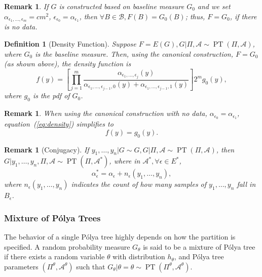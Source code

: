 \documentclass[12pt]{article}
\newtheorem{deff}[thm]{Definition}
\newtheorem{rmk}[thm]{Remark}
\newcommand{\polya}{P\'{o}lya}
\DeclareMathOperator{\pt}{PT}
\begin{document}
\begin{rmk}
  If $G$ is constructed based on baseline measure $G_0$ and we set
  $\alpha_{\epsilon_1, \ldots, \epsilon_m} = cm^2 $,
  $\epsilon_{\epsilon_0 }= \alpha_{\epsilon_1}$, then $\forall B \in
  \mathcal{B}, F(B) = G_0(B)$; thus, $F=G_0$, if there is no data.
\end{rmk}

\begin{deff}[Density Function]
  Suppose $F=E(G), G|\Pi, \mathcal{A} \sim \pt (\Pi, \mathcal{A})$,
  where $G_0 $ is the baseline measure. Then, using the canonical
  construction, $F=G_0$ (as shown above), the density function is
  \begin{equation}\label{eq:density}
    f(y) = \left[ \prod_{j=1}^m \frac{ \alpha_{\epsilon_1, \ldots,
          \epsilon_j}(y)}{\alpha_{\epsilon_1, \ldots, \epsilon_{j-1},0}(y)
        + \alpha_{\epsilon_1, \ldots, \epsilon_{j-1},1}(y)} \right] 2^{m } g_0(y),
  \end{equation}
  where $g_0$ is the pdf of $G_0$.
\end{deff}

\begin{rmk}
  When using the canonical construction with no data,
  $\alpha_{\epsilon_0 } = \alpha_{\epsilon_1}$, equation~(\ref{eq:density})
  simplifies to
  \begin{displaymath}
    f(y) = g_0(y).
  \end{displaymath}
\end{rmk}

\begin{rmk}[Conjugacy] If $y_1, \ldots, y_n | G \sim G, G|\Pi,
  \mathcal{A} \sim \pt (\Pi, \mathcal{A})$, then $G|y_1, \ldots, y_n,
  \Pi, \mathcal{A} \sim \pt (\Pi, \mathcal{A}^{*})$, where in
  $\mathcal{A}^{*}, \forall \epsilon \in E^{*}$,
  \begin{displaymath}
    \alpha_{\epsilon}^{*} = \alpha_{\epsilon} + n_{\epsilon}(y_1, \ldots, y_n),
  \end{displaymath}
  where $n_{\epsilon}(y_1, \ldots, y_n)$ indicates the count of how many
  samples of $y_1, \ldots, y_n$ fall in $B_{\epsilon}$.
\end{rmk}

\subsubsection{Mixture of \polya{} Trees}
The behavior of a single \polya{} tree highly depends on how the
partition is specified. A random probability measure $G_\theta$ is
said to be a mixture of \polya{} tree if there exists a random
variable $\theta$ with distribution $h_{\theta}$, and \polya{} tree
parameters $(\Pi^{\theta}, \mathcal{A}^{\theta})$ such that
$G_{\theta} | \theta=\theta \sim \pt (\Pi^{\theta},
\mathcal{A}^{\theta})$.
\end{document}
